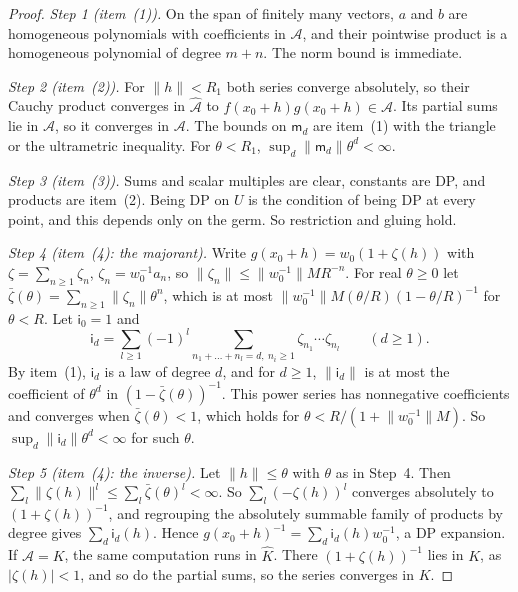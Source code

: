\documentclass[11pt]{amsart}
\theoremstyle{definition}
\theoremstyle{remark}
\numberwithin{equation}{section}
\newcommand{\abs}[1]{\lvert #1\rvert}
\newcommand{\norm}[1]{\lVert #1\rVert}
\newcommand{\Kh}{\widehat K}
\theoremstyle{plain}
\theoremstyle{definition}
\theoremstyle{plain}
\begin{document}
\begin{proof}
\emph{Step 1 (item~(1)).} On the span of finitely many vectors, $a$ and $b$ are homogeneous polynomials with coefficients in $\mathcal A$, and their pointwise product is a homogeneous polynomial of degree $m+n$. The norm bound is immediate.

\emph{Step 2 (item~(2)).} For $\norm h<R_1$ both series converge absolutely, so their Cauchy product converges in $\widehat{\mathcal A}$ to $f(x_0+h)g(x_0+h)\in\mathcal A$. Its partial sums lie in $\mathcal A$, so it converges in $\mathcal A$. The bounds on $\mathsf m_d$ are item~(1) with the triangle or the ultrametric inequality. For $\theta<R_1$, $\sup_d\norm{\mathsf m_d}\theta^d<\infty$.

\emph{Step 3 (item~(3)).} Sums and scalar multiples are clear, constants are DP, and products are item~(2). Being DP on $U$ is the condition of being DP at every point, and this depends only on the germ. So restriction and gluing hold.

\emph{Step 4 (item~(4): the majorant).} Write $g(x_0+h)=w_0(1+\zeta(h))$ with $\zeta=\sum_{n\ge1}\zeta_n$, $\zeta_n=w_0^{-1}a_n$, so $\norm{\zeta_n}\le\norm{w_0^{-1}}MR^{-n}$. For real $\theta\ge0$ let $\bar\zeta(\theta)=\sum_{n\ge1}\norm{\zeta_n}\theta^n$, which is at most $\norm{w_0^{-1}}M(\theta/R)(1-\theta/R)^{-1}$ for $\theta<R$. Let $\mathsf i_0=1$ and
\[
 \mathsf i_d=\sum_{l\ge1}(-1)^l\sum_{n_1+\dots+n_l=d,\ n_i\ge1}\zeta_{n_1}\cdots\zeta_{n_l}\qquad(d\ge1).
\]
By item~(1), $\mathsf i_d$ is a law of degree $d$, and for $d\ge1$, $\norm{\mathsf i_d}$ is at most the coefficient of $\theta^d$ in $(1-\bar\zeta(\theta))^{-1}$. This power series has nonnegative coefficients and converges when $\bar\zeta(\theta)<1$, which holds for $\theta<R/(1+\norm{w_0^{-1}}M)$. So $\sup_d\norm{\mathsf i_d}\theta^d<\infty$ for such $\theta$.

\emph{Step 5 (item~(4): the inverse).} Let $\norm h\le\theta$ with $\theta$ as in Step~4. Then $\sum_l\norm{\zeta(h)}^l\le\sum_l\bar\zeta(\theta)^l<\infty$. So $\sum_l(-\zeta(h))^l$ converges absolutely to $(1+\zeta(h))^{-1}$, and regrouping the absolutely summable family of products by degree gives $\sum_d\mathsf i_d(h)$. Hence $g(x_0+h)^{-1}=\sum_d\mathsf i_d(h)w_0^{-1}$, a DP expansion. If $\mathcal A=K$, the same computation runs in $\Kh$. There $(1+\zeta(h))^{-1}$ lies in $K$, as $\abs{\zeta(h)}<1$, and so do the partial sums, so the series converges in $K$.


\end{proof}
\end{document}

